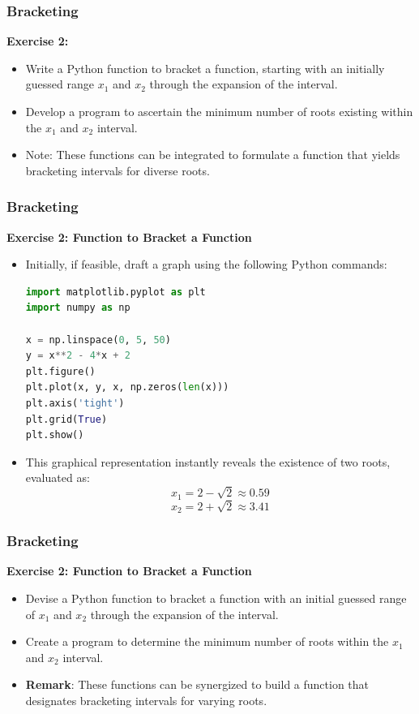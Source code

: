   \begin{frame}[fragile]
    \frametitle{Bracketing}
  
    \textbf{Exercise 2:}
    \begin{itemize}
      \item Write a Python function to bracket a function, starting with an initially guessed range \(x_1\) and \(x_2\) through the expansion of the interval.
      \item Develop a program to ascertain the minimum number of roots existing within the \(x_1\) and \(x_2\) interval.
      \item Note: These functions can be integrated to formulate a function that yields bracketing intervals for diverse roots.
    \end{itemize}
  \end{frame}
  
  \begin{frame}[fragile]
    \frametitle{Bracketing}
  
    \textbf{Exercise 2: Function to Bracket a Function}
    
    \begin{itemize}
      \item Initially, if feasible, draft a graph using the following Python commands:
        \begin{lstlisting}[language=Python]
import matplotlib.pyplot as plt
import numpy as np

x = np.linspace(0, 5, 50)
y = x**2 - 4*x + 2
plt.figure()
plt.plot(x, y, x, np.zeros(len(x)))
plt.axis('tight')
plt.grid(True)
plt.show()
        \end{lstlisting}
      \item This graphical representation instantly reveals the existence of two roots, evaluated as:
        \[
        x_1 = 2 - \sqrt{2} \approx 0.59
        \]
        \[
        x_2 = 2 + \sqrt{2} \approx 3.41
        \]
    \end{itemize}
  
  \end{frame}
  
  \begin{frame}[fragile]
    \frametitle{Bracketing}
  
    \textbf{Exercise 2: Function to Bracket a Function}
    \begin{itemize}
      \item Devise a Python function to bracket a function with an initial guessed range of \( x_1 \) and \( x_2 \) through the expansion of the interval.
      \item Create a program to determine the minimum number of roots within the \( x_1 \) and \( x_2 \) interval.
      \item \textbf{Remark}: These functions can be synergized to build a function that designates bracketing intervals for varying roots.
    \end{itemize}
  \end{frame}
  
